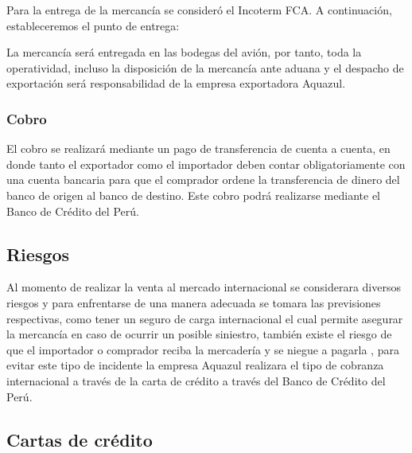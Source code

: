 \documentclass[
  stu,
  floatsintext,
  longtable,
  a4paper,
  nolmodern,
  notxfonts,
  notimes,
  colorlinks=true,linkcolor=blue,citecolor=blue,urlcolor=blue]{apa7}
\begin{document}
Para la entrega de la mercancía se consideró el Incoterm FCA. A
continuación, estableceremos el punto de entrega:

La mercancía será entregada en las bodegas del avión, por tanto, toda la
operatividad, incluso la disposición de la mercancía ante aduana y el
despacho de exportación será responsabilidad de la empresa exportadora
Aquazul.

\subsubsection{Cobro}\label{cobro}

El cobro se realizará mediante un pago de transferencia de cuenta a
cuenta, en donde tanto el exportador como el importador deben contar
obligatoriamente con una cuenta bancaria para que el comprador ordene la
transferencia de dinero del banco de origen al banco de destino. Este
cobro podrá realizarse mediante el Banco de Crédito del Perú.

\subsection{Riesgos}\label{riesgos}

Al momento de realizar la venta al mercado internacional se considerara
diversos riesgos y para enfrentarse de una manera adecuada se tomara las
previsiones respectivas, como tener un seguro de carga internacional el
cual permite asegurar la mercancía en caso de ocurrir un posible
siniestro, también existe el riesgo de que el importador o comprador
reciba la mercadería y se niegue a pagarla , para evitar este tipo de
incidente la empresa Aquazul realizara el tipo de cobranza internacional
a través de la carta de crédito a través del Banco de Crédito del Perú.

\subsection{Cartas de crédito}\label{cartas-de-cruxe9dito}
\end{document}
